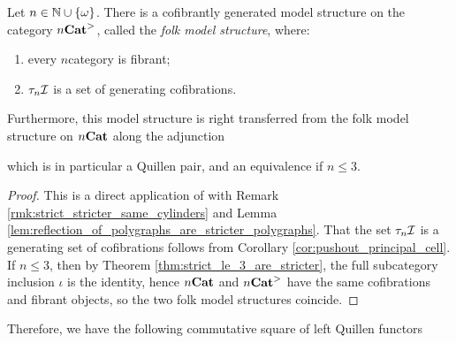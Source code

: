 \begin{thm} \label{thm:folk_model_structure_on_stricter_n}
    Let \( n \in \mathbb{N} \cup \left\{ {\omega} \right\} \).
    There is a cofibrantly generated model structure on the category \( {n\mathbf{Cat}}^> \), called the \emph{folk model structure}, where:
    \begin{enumerate}
        \item every \( n \)\nbd category is fibrant;
        \item \( \tau_{n}\mathcal{I} \) is a set of generating cofibrations.
    \end{enumerate}
    Furthermore, this model structure is right transferred from the folk model structure on \( {n\mathbf{Cat}} \) along the adjunction 
    \begin{center}
    \end{center}
    which is in particular a Quillen pair, and an equivalence if \( n \le 3 \).
\end{thm}
\begin{proof}
    This is a direct application of \cite[Proposition 21.3.2]{ara2025polygraphs} with Remark \ref{rmk:strict_stricter_same_cylinders} and Lemma \ref{lem:reflection_of_polygraphs_are_stricter_polygraphs}.
    That the set \( \tau_{n}\mathcal{I} \) is a generating set of cofibrations follows from Corollary \ref{cor:pushout_principal_cell}.
    If \( n \le 3 \), then by Theorem \ref{thm:strict_le_3_are_stricter}, the full subcategory inclusion \( \iota \) is the identity, hence \( {n\mathbf{Cat}} \) and \( {n\mathbf{Cat}}^> \) have the same cofibrations and fibrant objects, so the two folk model structures coincide. 
\end{proof}

\noindent Therefore, we have the following commutative square of left Quillen functors
\begin{center}
\end{center}



